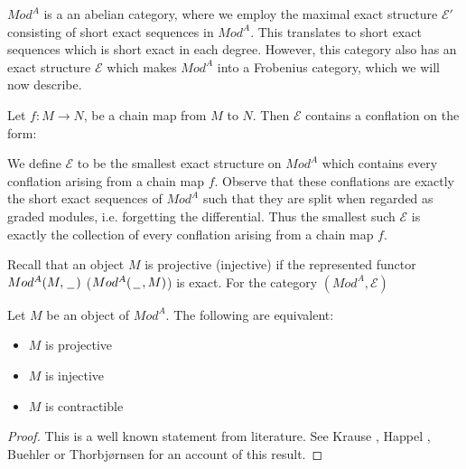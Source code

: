 \documentclass[../thesis.tex]{subfiles}
\begin{document}
            $Mod^A$ is a an abelian category, where we employ the maximal exact structure $\mathcal{E}'$ consisting of short exact sequences in $Mod^A$. This translates to short exact sequences which is short exact in each degree. However, this category also has an exact structure $\mathcal{E}$ which makes $Mod^A$ into a Frobenius category, which we will now describe.

            Let $f : M \rightarrow N$, be a chain map from $M$ to $N$. Then $\mathcal{E}$ contains a conflation on the form:
            \begin{center}
            \end{center}
            We define $\mathcal{E}$ to be the smallest exact structure on $Mod^A$ which contains every conflation arising from a chain map $f$. Observe that these conflations are exactly the short exact sequences of $Mod^A$ such that they are split when regarded as graded modules, i.e. forgetting the differential. Thus the smallest such $\mathcal{E}$ is exactly the collection of every conflation arising from a chain map $f$.

            Recall that an object $M$ is projective (injective) if the represented functor $Mod^A(M,\hspace{0.05cm}\underline{\hspace{0.2cm}}\hspace{0.05cm})$ ($Mod^A(\hspace{0.05cm}\underline{\hspace{0.2cm}}\hspace{0.05cm},M)$) is exact. For the category $(Mod^A, \mathcal{E})$

            \begin{proposition}
                Let $M$ be an object of $Mod^A$. The following are equivalent:
                \begin{itemize}
                    \item $M$ is projective
                    \item $M$ is injective
                    \item $M$ is contractible
                \end{itemize}
            \end{proposition}

            \begin{proof}
                This is a well known statement from literature. See Krause \cite{Krause21}, Happel \cite{Happel88}, Buehler \cite{Buhler10} or Thorbjørnsen \cite{Thorbjornsen21} for an account of this result.
            \end{proof}
\end{document}
